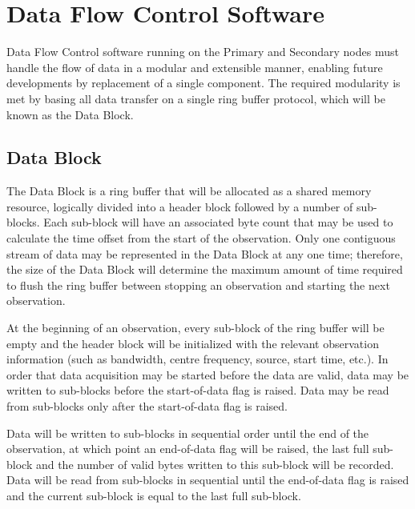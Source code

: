 \chapter{Data Flow Control Software}

Data Flow Control software running on the Primary and Secondary nodes
must handle the flow of data in a modular and extensible manner,
enabling future developments by replacement of a single component.
The required modularity is met by basing all data transfer on a single
ring buffer protocol, which will be known as the Data Block.

\section{Data Block}
\label{sec:data_block}

The Data Block is a ring buffer that will be allocated as a shared
memory resource, logically divided into a header block followed by a
number of sub-blocks.  Each sub-block will have an associated byte
count that may be used to calculate the time offset from the start of
the observation.  Only one contiguous stream of data may be
represented in the Data Block at any one time; therefore, the size of
the Data Block will determine the maximum amount of time required to
flush the ring buffer between stopping an observation and starting the
next observation.


At the beginning of an observation, every sub-block of the ring buffer
will be empty and the header block will be initialized with the
relevant observation information (such as bandwidth, centre frequency,
source, start time, etc.). In order that data acquisition may be
started before the data are valid, data may be written to sub-blocks
before the start-of-data flag is raised.  Data may be read from
sub-blocks only after the start-of-data flag is raised.


Data will be written to sub-blocks in sequential order until the end
of the observation, at which point an end-of-data flag will be raised,
the last full sub-block and the number of valid bytes written to this
sub-block will be recorded.   Data will be read from sub-blocks in
sequential until the end-of-data flag is raised and the current
sub-block is equal to the last full sub-block.

